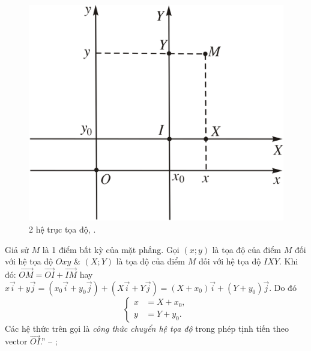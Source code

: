 \documentclass{article}
\numberwithin{equation}{section}
\begin{document}
\begin{figure}[h]
	\centering
	\includegraphics[scale=0.13]{2_he_truc_toa_do}
	\caption{2 hệ trục tọa độ, \cite[Hình 1.5, p. 25]{SGK_Toan_12_giai_tich_nang_cao}.}
	\label{fig:2_he_truc_toa_do}
\end{figure}
Giả sử $M$ là 1 điểm bất kỳ của mặt phẳng. Gọi $(x;y)$ là tọa độ của điểm $M$ đối với hệ tọa độ $Oxy$ \& $(X;Y)$ là tọa độ của điểm $M$ đối với hệ tọa độ $IXY$. Khi đó: $\overrightarrow{OM} = \overrightarrow{OI} + \overrightarrow{IM}$ hay $x\vec{i} + y\vec{j} = (x_0\vec{i} + y_0\vec{j}) + (X\vec{i} + Y\vec{j}) = (X + x_0)\vec{i} + (Y + y_0)\vec{j}$. Do đó
\begin{equation*}
	\left\{\begin{split}
		x &= X + x_0,\\
		y &= Y + y_0.
	\end{split}\right.
\end{equation*}
Các hệ thức trên gọi là \textit{công thức chuyển hệ tọa độ} trong phép tịnh tiến theo vector $\overrightarrow{OI}$.'' -- \cite[p. 25]{SGK_Toan_12_giai_tich_nang_cao}; \cite[p. 6]{TL_chuyen_Toan_Giai_Tich_12}
\end{document}
